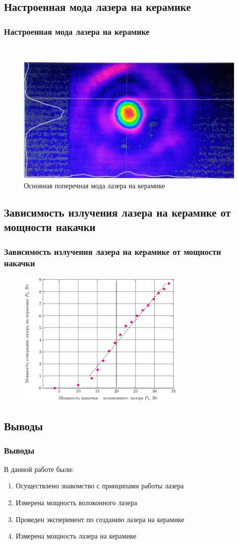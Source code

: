 \documentclass[10pt,pdf,hyperref={unicode}, dvipsnames]{beamer}
\newcommand\frametitless[1]{\subsection{#1}\frametitle{#1}}
\begin{document}
\begin{frame}[t]
	\frametitless{Настроенная мода лазера на керамике}
	\vfill
\
			\begin{figure}[h]
				\centering
				\includegraphics[width=\textwidth]{photo/light}
				\caption{Основная поперечная мода лазера на керамике}
			\end{figure}	
	\vfill
\end{frame}
\begin{frame}[t]
	\frametitless{Зависимость излучения лазера на керамике от мощности накачки}
		\begin{figure}[tb]
		\centering
		\includegraphics[width=0.73\textwidth]{img/P2P1}
	\end{figure}
\end{frame}
\begin{frame}
	\frametitless{Выводы}
	В данной работе были:
	\begin{enumerate}
		\item Осуществлено знакомство с принципами работы  лазера
		\item Измерена мощность волоконного лазера
		\item Проведен эксперимент по созданию лазера на керамике
		\item Измерена мощность лазера на керамике
	\end{enumerate}
\end{frame}
\end{document}
